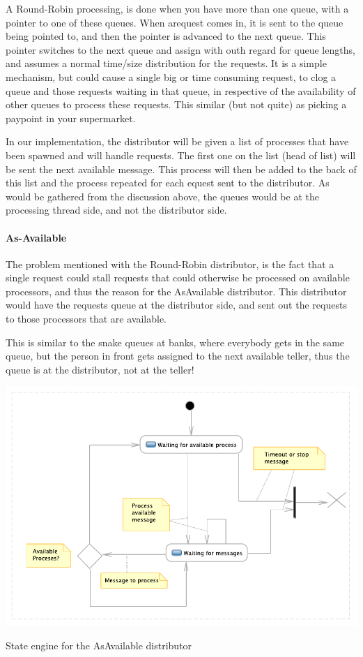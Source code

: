 \documentclass[a4paper,11pt]{report}
\begin{document}
 A Round-Robin  processing, is done when you have more than one queue,
 with a pointer to one of these queues. When arequest comes in, it is
 sent to the queue being pointed to, and then the pointer is advanced
 to the next queue. This pointer switches to the next queue
and assign with outh regard for queue lengths, and assumes a normal
time/size distribution for the requests. It is a simple mechanism, but
could cause a single big or time consuming request, to clog a queue
and those requests waiting in that queue, in respective of the
availability of other queues to process these requests. This similar
(but not quite) as picking a paypoint in your supermarket.

In our implementation, the distributor will be given a list of
processes that have been spawned and will handle requests. The first
one on the list (head of list) will be sent the next available
message. This process will then be added to the back of this list and
the process repeated for each equest sent to the distributor. As would
be gathered from the discussion above, the queues would be at the
processing thread side, and not the distributor side.

\paragraph{As-Available}

The problem mentioned with the Round-Robin distributor, is the fact
that a single request could stall requests that could otherwise be
processed on available processors, and thus the reason for the
AsAvailable distributor. This distributor would have the requests
queue at the distributor side, and sent out the requests to those
processors that are available.

This is similar to the snake queues at banks, where everybody gets in
the same queue, but the person in front gets assigned to the next
available teller, thus the queue is at the distributor, not at the
teller!


\label{sec:as-available}
\begin{Figure}[htb] %
	 \centering
	 \includegraphics[scale=1]{AsAvailable_states.pdf} 
	 \caption{State engine for the AsAvailable distributor}
	 \label{fig:AsAvailable}
\end{Figure}
\end{document}
